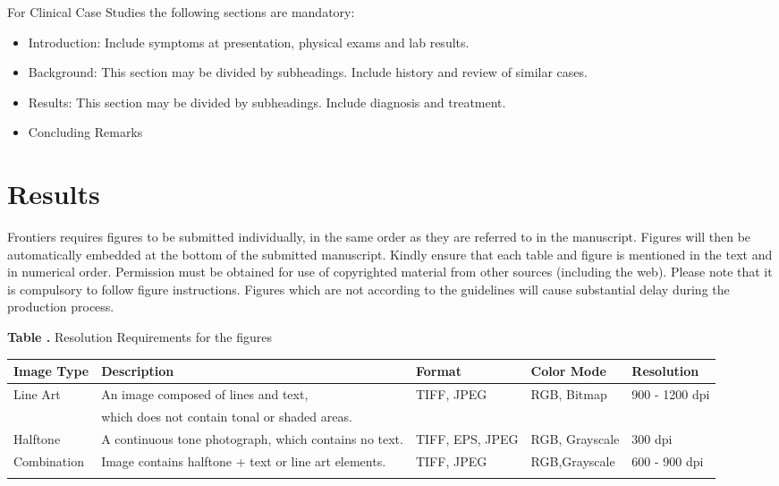 \documentclass{frontiersSCNS} %
\begin{document}
For Clinical Case Studies the following sections are mandatory:

\begin{itemize}
\item Introduction: Include symptoms at presentation, physical exams and lab results.
\item Background: This section may be divided by subheadings. Include history and review of similar cases.
\item Results: This section may be divided by subheadings. Include diagnosis and treatment.
\item Concluding Remarks
\end{itemize}




\section{Results}

Frontiers requires figures to be submitted individually, in the same order as they are referred to in the manuscript. Figures will then be automatically embedded at the bottom of the submitted manuscript. Kindly ensure that each table and figure is mentioned in the text and in numerical order. Permission must be obtained for use of copyrighted material from other sources (including the web). Please note that it is compulsory to follow figure instructions. Figures which are not according to the guidelines will cause substantial delay during the production process.

\begin{table}[!t]
\textbf{\label{Tab:02} Table .}{ Resolution Requirements for the figures}

\processtable{}
{\begin{tabular}{lllll}\toprule
Image Type & Description & Format & Color Mode & Resolution\\\midrule
Line Art & An image composed of lines and text,  & TIFF, JPEG & RGB, Bitmap & 900 - 1200 dpi\\
           & which does not contain tonal or shaded areas.& & &\\
           Halftone & A continuous tone photograph, which contains no text. & TIFF, EPS, JPEG & RGB, Grayscale & 300 dpi\\
Combination & Image contains halftone + text or line art elements. & TIFF, JPEG & RGB,Grayscale & 600 - 900 dpi\\\botrule
\end{tabular}}{}
\end{table}
\end{document}
